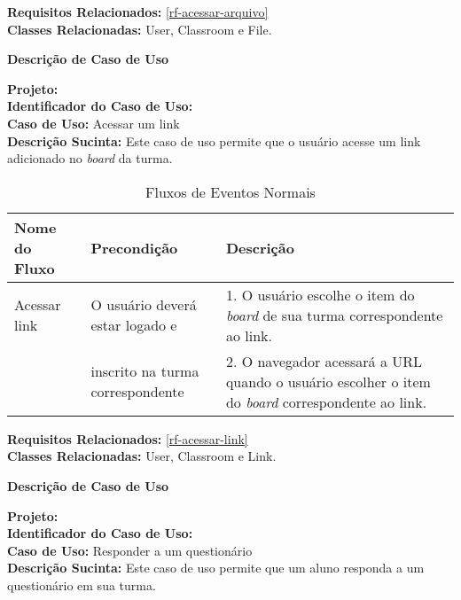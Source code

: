 \noindent  \textbf{Requisitos Relacionados:} \ref{rf-acessar-arquivo}       \\ \textbf{Classes Relacionadas:} User, Classroom e File.

\newpage
\clearpage
\begin{flushright}    \textbf{Descrição de Caso de Uso}   \end{flushright}         
\noindent \textbf{Projeto:} \imprimirtitulo  \\
\textbf{Identificador do Caso de Uso:} \UC\label{uc-acessar-link} \\
\textbf{Caso de Uso:} Acessar um link \\
\noindent \textbf{Descrição Sucinta:} Este caso de uso permite que o usuário acesse um link adicionado no \textit{board} da turma.\\

\begin{table}[H]
	\centering \vspace{0.5cm} \footnotesize
	\caption{Fluxos de Eventos Normais}
	\begin{tabular}{|p{2.3cm}|p{2.5cm}|p{10cm}|} \hline  \rowcolor[rgb]{0.8,0.8,0.8}
		
		Nome do Fluxo & Precondição & Descrição  \\ \hline		
		
		Acessar link & O usuário deverá estar logado e & 1. O usuário escolhe o item do \textit{board} de sua turma correspondente ao link.  \\
		{}    & inscrito na turma correspondente& 2. O navegador acessará a URL quando o usuário escolher o item do \textit{board} correspondente ao link.\\ \hline 
		
		
	\end{tabular}
\end{table}

\noindent  \textbf{Requisitos Relacionados:} \ref{rf-acessar-link}       \\ \textbf{Classes Relacionadas:} User, Classroom e Link.

\newpage
\clearpage
\begin{flushright}    \textbf{Descrição de Caso de Uso}   \end{flushright}         
\noindent \textbf{Projeto:} \imprimirtitulo  \\
\textbf{Identificador do Caso de Uso:} \UC\label{uc-responder-questionario} \\
\textbf{Caso de Uso:} Responder a um questionário \\
\noindent \textbf{Descrição Sucinta:} Este caso de uso permite que um aluno responda a um questionário em sua turma.\\

